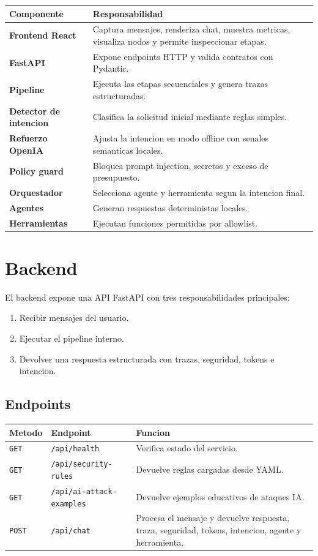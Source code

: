 \documentclass[12pt,letterpaper]{article}
\begin{document}
\begin{center}
\begin{tabular}{>{\bfseries}p{4cm}p{10cm}}
\toprule
Componente & Responsabilidad \\
\midrule
Frontend React & Captura mensajes, renderiza chat, muestra metricas, visualiza nodos y permite inspeccionar etapas. \\
FastAPI & Expone endpoints HTTP y valida contratos con Pydantic. \\
Pipeline & Ejecuta las etapas secuenciales y genera trazas estructuradas. \\
Detector de intencion & Clasifica la solicitud inicial mediante reglas simples. \\
Refuerzo OpenIA & Ajusta la intencion en modo offline con senales semanticas locales. \\
Policy guard & Bloquea prompt injection, secretos y exceso de presupuesto. \\
Orquestador & Selecciona agente y herramienta segun la intencion final. \\
Agentes & Generan respuestas deterministas locales. \\
Herramientas & Ejecutan funciones permitidas por allowlist. \\
\bottomrule
\end{tabular}
\end{center}

\section{Backend}

El backend expone una API FastAPI con tres responsabilidades principales:

\begin{enumerate}
  \item Recibir mensajes del usuario.
  \item Ejecutar el pipeline interno.
  \item Devolver una respuesta estructurada con trazas, seguridad, tokens e intencion.
\end{enumerate}

\subsection{Endpoints}

\begin{longtable}{p{2.2cm}p{4.5cm}p{7cm}}
\toprule
\textbf{Metodo} & \textbf{Endpoint} & \textbf{Funcion} \\
\midrule
\endhead
\texttt{GET} & \texttt{/api/health} & Verifica estado del servicio. \\
\texttt{GET} & \texttt{/api/security-rules} & Devuelve reglas cargadas desde YAML. \\
\texttt{GET} & \texttt{/api/ai-attack-examples} & Devuelve ejemplos educativos de ataques IA. \\
\texttt{POST} & \texttt{/api/chat} & Procesa el mensaje y devuelve respuesta, traza, seguridad, tokens, intencion, agente y herramienta. \\
\bottomrule
\end{longtable}
\end{document}
